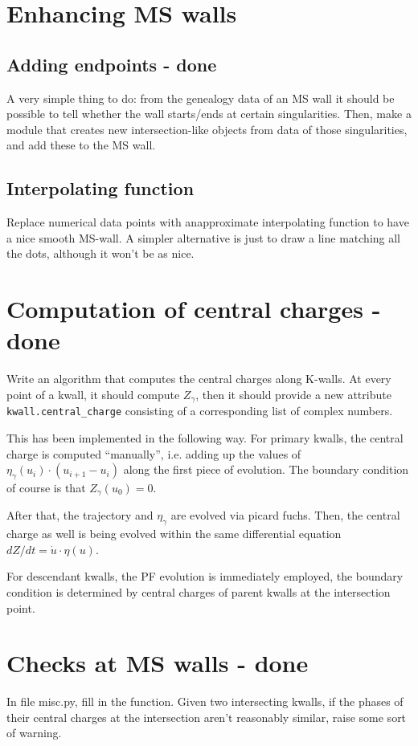 \documentclass[11pt]{report}
\begin{document}
\section{Enhancing MS walls}\label{sec:bp-to-int}
\subsection{Adding endpoints  - {\color{red} \bf done}}
A very simple thing to do: from the genealogy data of an MS wall it should be possible to tell whether the wall starts/ends at certain singularities. Then, make a module that creates new intersection-like objects from data of those singularities, and add these to the MS wall. 

\subsection{Interpolating function}
Replace numerical data points with anapproximate interpolating function to have a nice smooth MS-wall. A simpler alternative is just to draw a line matching all the dots, although it won't be as nice.



\section{Computation of central charges   - {\color{red} \bf done}}
Write an algorithm that computes the central charges along K-walls.
At every point of a kwall, it should compute $Z_{\gamma}$, then it should provide a new attribute {\tt kwall.central\_{charge}} consisting of a corresponding list of complex numbers.

{\color{blue}
This has been implemented in the following way. For primary kwalls, the central charge is computed ``manually'', i.e. adding up the values of $\eta_{\gamma}(u_{i})\cdot (u_{i+1} - u_{i})$ along the first piece of evolution. The boundary condition of course is that $Z_{\gamma}(u_{0}) = 0$.

After that, the trajectory and $\eta_{\gamma}$ are evolved via picard fuchs. Then, the central charge as well is being evolved within the same differential equation $dZ/dt = \dot u \cdot \eta(u)$.

For descendant kwalls, the PF evolution is immediately employed, the boundary condition is determined by central charges of parent kwalls at the intersection point.
}



\section{Checks at MS walls   - {\color{red} \bf done}}
In file misc.py, fill in the function. Given two intersecting kwalls, if the phases of their central charges at the intersection aren't reasonably similar, raise some sort of warning.
\end{document}
